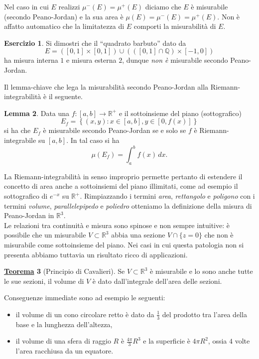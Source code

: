 \documentclass[a4paper,twoside]{article}
\newcommand{\Q}{\mathbb{Q}}
\newcommand{\R}{\mathbb{R}}
\theoremstyle{definition}
\newtheorem{theorem}{\color{Red}\underline{\textrm Teorema}}
\newtheorem{lemma}[theorem]{Lemma}
\newtheorem{ex}[theorem]{Esercizio}
\numberwithin{theorem}{section}
\begin{document}
Nel caso in cui $E$ realizzi $\mu^-(E)=\mu^+(E)$ diciamo che $E$ è misurabile (secondo Peano-Jordan) e la sua area è $\mu(E)=\mu^-(E)=\mu^+(E)$. Non è affatto automatico che la limitatezza di $E$ comporti la misurabilità di $E$.
\begin{ex} Si dimostri che il ``quadrato barbuto'' dato da
$$ E=([0,1]\times[0,1])\cup (([0,1]\cap\Q)\times [-1,0]) $$
ha misura interna $1$ e misura esterna $2$, dunque \emph{non è} misurabile secondo Peano-Jordan. 
\end{ex}
Il lemma-chiave che lega la misurabilità secondo Peano-Jordan alla Riemann-integrabilità è il seguente.
\begin{lemma} Data una $f:[a,b]\to\R^+$ e il sottoinsieme del piano (sottografico) 
$$ E_f = \left\{(x,y): x\in[a,b], y\in[0,f(x)]\right\} $$
si ha che $E_f$ è misurabile secondo Peano-Jordan se e solo se $f$ è Riemann-integrabile su $[a,b]$. In tal caso si ha 
$$ \mu(E_f)=\int_{a}^{b} f(x)\,dx.$$
\end{lemma}

La Riemann-integrabilità in senso improprio permette pertanto di estendere il concetto di area anche a sottoinsiemi del piano illimitati, come ad esempio il sottografico di $e^{-x}$ su $\R^+$. Rimpiazzando i termini \emph{area}, \emph{rettangolo} e \emph{poligono} con i termini \emph{volume}, \emph{parallelepipedo} e \emph{poliedro} otteniamo la definizione della misura di Peano-Jordan in $\R^3$.\\
Le relazioni tra continuità e misura sono spinose e non sempre intuitive: è possibile che un misurabile $V\subset\R^3$ abbia una sezione $V\cap\{z=0\}$ che non è misurabile come sottoinsieme del piano. Nei casi in cui questa patologia non si presenta abbiamo tuttavia un risultato ricco di applicazioni.

\begin{theorem}[Principio di Cavalieri] Se $V\subset\R^3$ è misurabile e lo sono anche tutte le sue sezioni, il volume di $V$ è dato dall'integrale dell'area delle sezioni. 
\end{theorem}

Conseguenze immediate sono ad esempio le seguenti:
\begin{itemize}
 \item il volume di un cono circolare retto è dato da $\frac{1}{3}$ del prodotto tra l'area della base e la lunghezza dell'altezza,
 \item il volume di una sfera di raggio $R$ è $\frac{4\pi}{3}R^3$ e la superficie è $4\pi R^2$, ossia $4$ volte l'area racchiusa da un equatore.
\end{itemize}
\end{document}
